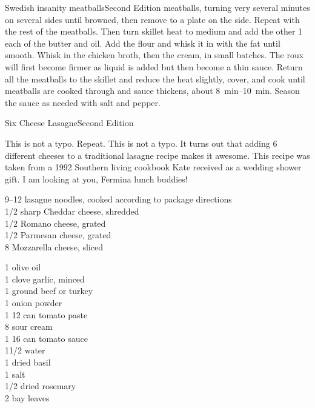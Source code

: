 \begin{entry}{Swedish insanity meatballs}{Second Edition}
meatballs, turning very several minutes on several sides until browned, then
remove to a plate on the side. Repeat with the rest of the meatballs. Then
turn skillet heat to medium and add the other \SI{1}{\tblspoon} each of the
butter and oil. Add the flour and whisk it in with the fat until smooth. Whisk
in the chicken broth, then the cream, in small batches. The roux will first
become firmer as liquid is added but then become a thin sauce. Return all the
meatballs to the skillet and reduce the heat slightly, cover, and cook until
meatballs are cooked through and sauce thickens, about
\SIrange{8}{10}{\minute}. Season the sauce as needed with salt and pepper.
\end{entry}

\begin{entry}{Six Cheese Lasagne}{Second Edition}

\begin{open}
  This is not a typo. Repeat. This is not a typo. It turns out that adding 6
  different cheeses to a traditional lasagne recipe makes it awesome. This
  recipe was taken from a 1992 Southern living cookbook Kate received as a
  wedding shower gift. I am looking at you, Fermina lunch buddies!
\end{open}

\begin{ingredients}
\numrange{9}{12} lasagne noodles, cooked according to package directions\\
\SI{1/2}{\cup} sharp Cheddar cheese, shredded\\
\SI{1/2}{\cup} Romano cheese, grated\\
\SI{1/2}{\cup} Parmesan cheese, grated \\
\SI{8}{\ounce} Mozzarella cheese, sliced
\end{ingredients}

\begin{ingredients}
    \SI{1}{\tblspoon} olive oil\\
    1 clove garlic, minced\\
    \SI{1}{\ounce} ground beef or turkey \\
    \SI{1}{\teaspoon} onion powder\\
    1 \SI{12}{\ounce} can tomato paste\\
    \SI{8}{\ounce} sour cream\\
    1 \SI{16}{\ounce} can tomato sauce\\
    1\SI{1/2}{\cup} water\\
    \SI{1}{\tblspoon} dried basil\\
    \SI{1}{\teaspoon} salt\\
    \SI{1/2}{\teaspoon} dried rosemary\\
    2 bay leaves
\end{ingredients}


\end{entry}
